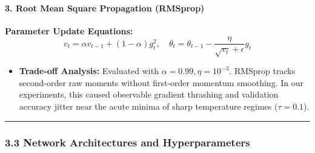 \paragraph{3. Root Mean Square Propagation
(RMSprop)}\label{3-root-mean-square-propagation-rmsprop}

\textbf{Parameter Update Equations:} \[
v_t = \alpha v_{t-1} + (1 - \alpha) g_t^2, \quad \theta_t = \theta_{t-1} - \frac{\eta}{\sqrt{v_t} + \epsilon} g_t
\]

\begin{itemize}
\tightlist
\item
  \textbf{Trade-off Analysis:} Evaluated with
  \(\alpha = 0.99, \eta = 10^{-3}\). RMSprop tracks second-order raw
  moments without first-order momentum smoothing. In our experiments,
  this caused observable gradient thrashing and validation accuracy
  jitter near the acute minima of sharp temperature regimes
  (\(\tau = 0.1\)).
\end{itemize}

\begin{center}\rule{0.5\linewidth}{0.5pt}\end{center}

\subsubsection{3.3 Network Architectures and
Hyperparameters}\label{33-network-architectures-and-hyperparameters}


